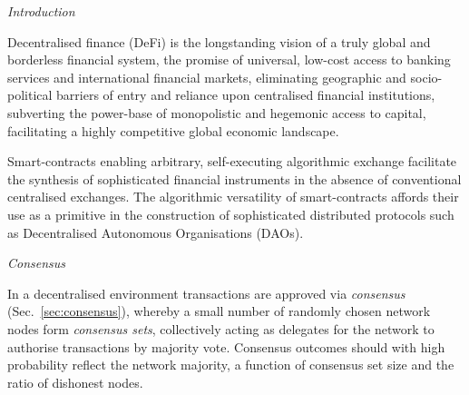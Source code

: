 \begin{center}\emph{Introduction}\end{center}

Decentralised finance (DeFi) is the longstanding vision of a truly global and borderless financial system, the promise of universal, low-cost access to banking services and international financial markets, eliminating geographic and socio-political barriers of entry and reliance upon centralised financial institutions, subverting the power-base of monopolistic and hegemonic access to capital, facilitating a highly competitive global economic landscape.

Smart-contracts enabling arbitrary, self-executing algorithmic exchange facilitate the synthesis of sophisticated financial instruments in the absence of conventional centralised exchanges. The algorithmic versatility of smart-contracts affords their use as a primitive in the construction of sophisticated distributed protocols such as Decentralised Autonomous Organisations (DAOs).


\begin{center}\emph{Consensus}\end{center}

In a decentralised environment transactions are approved via \emph{consensus} (Sec.~\ref{sec:consensus}), whereby a small number of randomly chosen network nodes form \emph{consensus sets}, collectively acting as delegates for the network to authorise transactions by majority vote. Consensus outcomes should with high probability reflect the network majority, a function of consensus set size and the ratio of dishonest nodes.

\begin{center}
	\vspace{2pt}
	\resizebox{0.6\columnwidth}{!}{}
\end{center}

